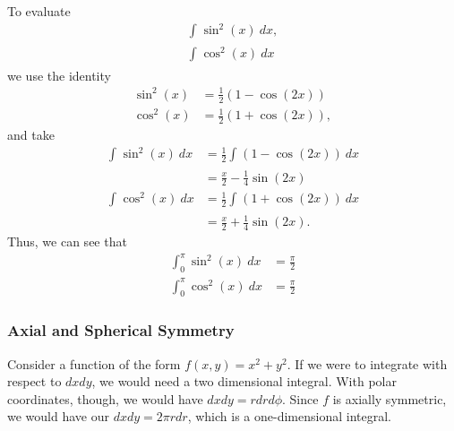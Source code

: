 \documentclass[10pt]{mypackage}
\begin{document}
\begin{example}
  To evaluate
  \begin{align*}
    \int_{}^{} \sin^{2}(x)\:dx,\\
    \int_{}^{} \cos^2(x)\:dx
  \end{align*}
  we use the identity
  \begin{align*}
    \sin^2(x) &= \frac{1}{2}\left(1-\cos(2x)\right)\\
    \cos^{2}(x) &= \frac{1}{2}\left(1 + \cos(2x)\right),
  \end{align*}
  and take
  \begin{align*}
    \int_{}^{} \sin^2(x)\:dx &= \frac{1}{2}\int_{}^{} \left(1-\cos(2x)\right)\:dx\\
                             &= \frac{x}{2} - \frac{1}{4}\sin(2x)\\
    \int_{}^{} \cos^2(x)\:dx &= \frac{1}{2}\int_{}^{} \left(1+\cos(2x)\right)\:dx\\
                             &= \frac{x}{2} + \frac{1}{4}\sin(2x).
  \end{align*}
  Thus, we can see that
  \begin{align*}
    \int_{0}^{\pi} \sin^2(x)\:dx&= \frac{\pi}{2}\\
    \int_{0}^{\pi} \cos^2(x)\:dx&= \frac{\pi}{2}
  \end{align*}
\end{example}
\subsubsection{Axial and Spherical Symmetry}%
Consider a function of the form $f(x,y) = x^2 + y^2$. If we were to integrate with respect to $dx dy$, we would need a two dimensional integral. With polar coordinates, though, we would have $dx dy = rdrd\phi$. Since $f$ is axially symmetric, we would have our $dx dy = 2\pi r dr$, which is a one-dimensional integral.\newline
\end{document}

